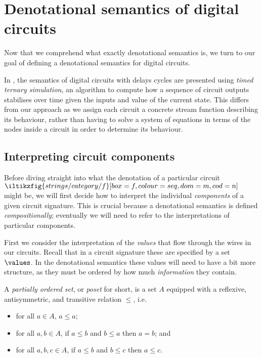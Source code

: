 \section{Denotational semantics of digital circuits}

Now that we comprehend what exactly denotational semantics is, we turn to our
goal of defining a denotational semantics for digital circuits.

\begin{remark}
    In \cite{mendler2012constructive}, the semantics of digital circuits with
    delays cycles are presented using \emph{timed ternary simulation}, an
    algorithm to compute how a sequence of circuit outputs stabilises over time
    given the inputs and value of the current state.
    This differs from our approach as we assign each circuit a concrete stream
    function describing its behaviour, rather than having to solve a system of
    equations in terms of the nodes inside a circuit in order to determine its
    behaviour.
\end{remark}

\subsection{Interpreting circuit components}

Before diving straight into what the denotation of a particular circuit \(
\iltikzfig{strings/category/f}[box=f,colour=seq,dom=m,cod=n]
\) might be, we will first decide how to interpret the individual
\emph{components} of a given circuit signature.
This is crucial because a denotational semantics is defined
\emph{compositionally}; eventually we will need to refer to the interpretations
of particular components.

First we consider the interpretation of the \emph{values} that flow through the
wires in our circuits.
Recall that in a circuit signature these are specified by a set \(\values\).
In the denotational semantics these values will need to have a bit more
structure, as they must be ordered by how much \emph{information} they contain.

\begin{definition}
    A \emph{partially ordered set}, or \emph{poset} for short, is a set \(A\)
    equipped with a reflexive, antisymmetric, and transitive relation \(\leq\),
    i.e.\
    \begin{itemize}
        \item for all \(a \in A\), \(a \leq a\);
        \item for all \(a, b \in A\), if \(a \leq b\) and \(b \leq a\) then
              \(a = b\); and
        \item for all \(a, b, c \in A\), if \(a \leq b\) and \(b \leq c\) then
              \(a \leq c\).
    \end{itemize}
\end{definition}

